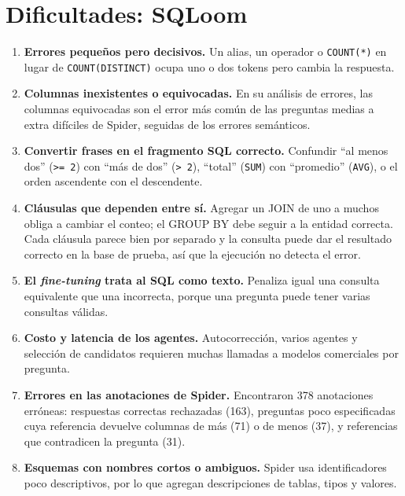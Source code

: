 \documentclass[11pt,a4paper]{article}
\begin{document}
\section{Dificultades: SQLoom}
\begin{enumerate}
  \item \textbf{Errores pequeños pero decisivos.} Un alias, un operador o \texttt{COUNT(*)} en lugar de \texttt{COUNT(DISTINCT)} ocupa uno o dos tokens pero cambia la respuesta.
  \item \textbf{Columnas inexistentes o equivocadas.} En su análisis de errores, las columnas equivocadas son el error más común de las preguntas medias a extra difíciles de Spider, seguidas de los errores semánticos.
  \item \textbf{Convertir frases en el fragmento SQL correcto.} Confundir ``al menos dos'' (\texttt{>= 2}) con ``más de dos'' (\texttt{> 2}), ``total'' (\texttt{SUM}) con ``promedio'' (\texttt{AVG}), o el orden ascendente con el descendente.
  \item \textbf{Cláusulas que dependen entre sí.} Agregar un JOIN de uno a muchos obliga a cambiar el conteo; el GROUP BY debe seguir a la entidad correcta. Cada cláusula parece bien por separado y la consulta puede dar el resultado correcto en la base de prueba, así que la ejecución no detecta el error.
  \item \textbf{El \textit{fine-tuning} trata al SQL como texto.} Penaliza igual una consulta equivalente que una incorrecta, porque una pregunta puede tener varias consultas válidas.
  \item \textbf{Costo y latencia de los agentes.} Autocorrección, varios agentes y selección de candidatos requieren muchas llamadas a modelos comerciales por pregunta.
  \item \textbf{Errores en las anotaciones de Spider.} Encontraron 378 anotaciones erróneas: respuestas correctas rechazadas (163), preguntas poco especificadas cuya referencia devuelve columnas de más (71) o de menos (37), y referencias que contradicen la pregunta (31).
  \item \textbf{Esquemas con nombres cortos o ambiguos.} Spider usa identificadores poco descriptivos, por lo que agregan descripciones de tablas, tipos y valores.
\end{enumerate}

\end{document}
